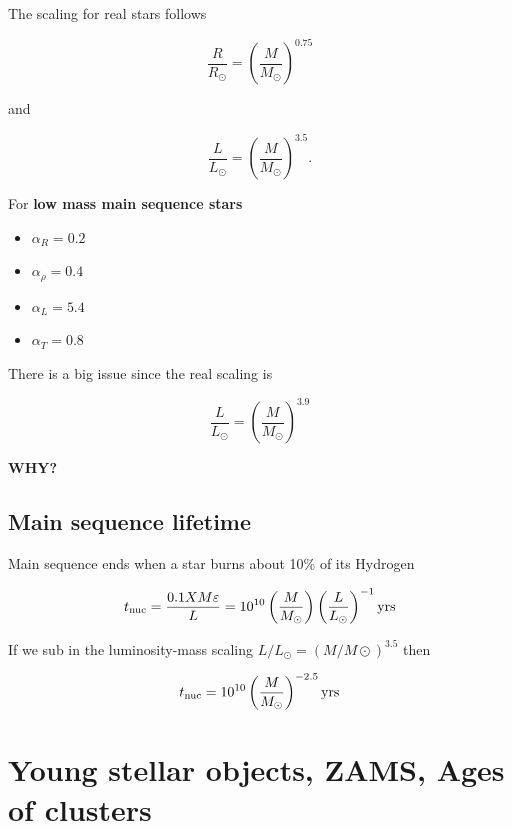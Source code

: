 \documentclass{article}
\begin{document}
The scaling for real stars follows

\begin{equation}
    \frac{R}{R_\odot} = \left(\frac{M}{M_\odot}\right)^{0.75}
\end{equation}

and

\begin{equation}
    \frac{L}{L_\odot} = \left(\frac{M}{M_\odot}\right)^{3.5}.
\end{equation}

For \textbf{low mass main sequence stars}

\begin{itemize}
    \item $\alpha_R = 0.2$
    \item $\alpha_\rho = 0.4$
    \item $\alpha_L = 5.4$
    \item $\alpha_T = 0.8$
\end{itemize}

There is a big issue since the real scaling is 

\begin{equation}
    \frac{L}{L_\odot} = \left(\frac{M}{M_\odot}\right)^{3.9}
\end{equation}

\textbf{WHY?}

\subsection{Main sequence lifetime}

Main sequence ends when a star burns about 10\% of its Hydrogen

\begin{equation}
    t_{\rm nuc} = \frac{0.1 X M \varepsilon}{L} = 10^{10}\left(\frac{M}{M_\odot}\right)\left(\frac{L}{L_\odot}\right)^{-1} {\rm yrs}
\end{equation}

If we sub in the luminosity-mass scaling $L/L_\odot = (M/M\odot)^{3.5}$ then

\begin{equation}
    t_{\rm nuc} = 10^{10}\left(\frac{M}{M_\odot}\right)^{-2.5} {\rm yrs}
\end{equation}

\section{Young stellar objects, ZAMS, Ages of clusters}
\end{document}
